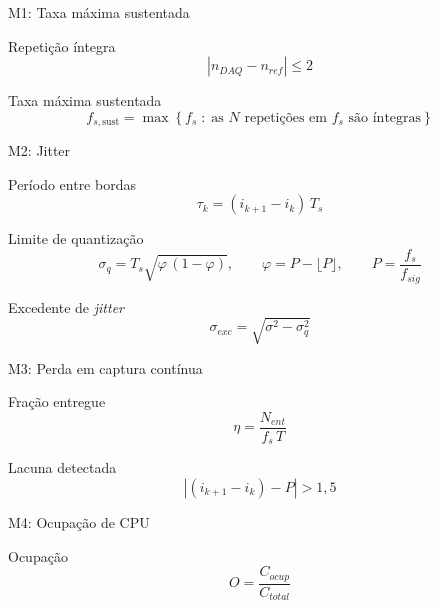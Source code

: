 \documentclass{UFAL-beamer-moderno}
\newcommand{\en}[1]{\textit{#1}}
\begin{document}

\begin{frame}{M1: Taxa máxima sustentada}
  \vfill
  \begin{block}{Repetição íntegra}
    \large
    \[ \left| n_{DAQ} - n_{ref} \right| \le 2 \]
  \end{block}
  \vspace{6pt}
  \begin{block}{Taxa máxima sustentada}
    \large
    \[ f_{s,\mathrm{sust}} = \max \left\{ f_s \;:\; \text{as } N \text{ repetições em } f_s
       \text{ são íntegras} \right\} \]
  \end{block}
  \vfill
\end{frame}

\begin{frame}{M2: Jitter}
  \begin{block}{Período entre bordas}
    \large
    \[ \tau_k = (i_{k+1} - i_k)\, T_s \]
  \end{block}
  \vspace{2pt}
  \begin{block}{Limite de quantização}
    \large
    \[ \sigma_q = T_s \sqrt{\varphi\,(1-\varphi)}, \qquad
       \varphi = P - \lfloor P \rfloor, \qquad P = \frac{f_s}{f_{sig}} \]
  \end{block}
  \vspace{2pt}
  \begin{block}{Excedente de \en{jitter}}
    \large
    \[ \sigma_{exc} = \sqrt{\sigma^2 - \sigma_q^2} \]
  \end{block}
\end{frame}

\begin{frame}{M3: Perda em captura contínua}
  \vfill
  \begin{block}{Fração entregue}
    \large
    \[ \eta = \frac{N_{ent}}{f_s \, T} \]
  \end{block}
  \vspace{6pt}
  \begin{block}{Lacuna detectada}
    \large
    \[ \left| (i_{k+1} - i_k) - P \right| > 1{,}5 \]
  \end{block}
  \vfill
\end{frame}

\begin{frame}{M4: Ocupação de CPU}
  \vfill
  \begin{block}{Ocupação}
    \large
    \[ O = \frac{C_{ocup}}{C_{total}} \]
  \end{block}
  \vfill
\end{frame}
\end{document}
